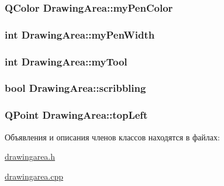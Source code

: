 \hypertarget{class_drawing_area_af15c369bbbaf2ec78a37dbbca638cf0b}{
\subsubsection[{my\+Pen\+Color}]{\setlength{\rightskip}{0pt plus 5cm}Q\+Color Drawing\+Area\+::my\+Pen\+Color\hspace{0.3cm}{\ttfamily [private]}}}\label{class_drawing_area_af15c369bbbaf2ec78a37dbbca638cf0b}
\hypertarget{class_drawing_area_acc5ff29833418bc205ff697b933b57fa}{
\subsubsection[{my\+Pen\+Width}]{\setlength{\rightskip}{0pt plus 5cm}int Drawing\+Area\+::my\+Pen\+Width\hspace{0.3cm}{\ttfamily [private]}}}\label{class_drawing_area_acc5ff29833418bc205ff697b933b57fa}
\hypertarget{class_drawing_area_a65c9ad1a31ed5c13e8aae18c1603d111}{
\subsubsection[{my\+Tool}]{\setlength{\rightskip}{0pt plus 5cm}int Drawing\+Area\+::my\+Tool\hspace{0.3cm}{\ttfamily [private]}}}\label{class_drawing_area_a65c9ad1a31ed5c13e8aae18c1603d111}
\hypertarget{class_drawing_area_ac47e1a721ed4caaf7c993fde729676eb}{
\subsubsection[{scribbling}]{\setlength{\rightskip}{0pt plus 5cm}bool Drawing\+Area\+::scribbling\hspace{0.3cm}{\ttfamily [private]}}}\label{class_drawing_area_ac47e1a721ed4caaf7c993fde729676eb}
\hypertarget{class_drawing_area_a10dc7b6502081bd5f9e08ae767f472b6}{
\subsubsection[{top\+Left}]{\setlength{\rightskip}{0pt plus 5cm}Q\+Point Drawing\+Area\+::top\+Left\hspace{0.3cm}{\ttfamily [private]}}}\label{class_drawing_area_a10dc7b6502081bd5f9e08ae767f472b6}


Объявления и описания членов классов находятся в файлах\+:\begin{DoxyCompactItemize}
\item 
\hyperlink{drawingarea_8h}{drawingarea.\+h}\item 
\hyperlink{drawingarea_8cpp}{drawingarea.\+cpp}\end{DoxyCompactItemize}
